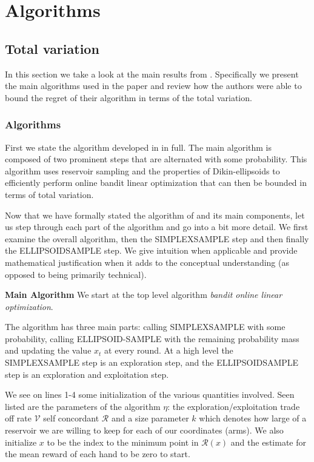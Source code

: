 \section{Algorithms}

\subsection{Total variation}
In this section we take a look at the main results from \citep{hazan}.
Specifically we present the main algorithms used in the paper and review 
how the authors were able to bound the regret of their algorithm in terms 
of the total variation.

\subsubsection{Algorithms}
First we state the algorithm developed in \citep{hazan} in full. The
main algorithm is composed of two prominent steps that are alternated with 
some probability. This algorithm uses reservoir sampling and the 
properties of Dikin-ellipsoids to efficiently perform online bandit linear
optimization that can then be bounded in terms of total variation.


\unskip

\unskip

\unskip

Now that we have formally stated the algorithm of \citep{hazan} and its main
components, let us step through each part of the algorithm and go into a 
bit more detail. We first examine the overall algorithm, then the 
SIMPLEXSAMPLE step and then finally the ELLIPSOIDSAMPLE step. We
give intuition when applicable and provide mathematical justification when
it adds to the conceptual understanding (as opposed to being primarily technical).

\textbf{Main Algorithm}
We start at the top level algorithm \textit{bandit online linear optimization}.

The algorithm has three main parts: calling SIMPLEXSAMPLE with some probability, calling ELLIPSOID-SAMPLE with the remaining probability mass and updating the value $x_t$ at every round. At a high level the SIMPLEXSAMPLE step is an exploration step, and the ELLIPSOIDSAMPLE step is an exploration and exploitation step.

We see on lines 1-4 some initialization of the various quantities involved. Seen listed are the parameters of the algorithm $\eta$: the exploration/exploitation trade off rate $\mathcal{V}$ self concordant $\mathcal{R}$ and a size parameter $k$ which denotes how large of a reservoir we are willing to keep for each of our coordinates (arms). We also initialize $x$ to be the index to the minimum point in $\mathcal{R}(x)$  and the estimate for the mean reward of each hand to be zero to start.

